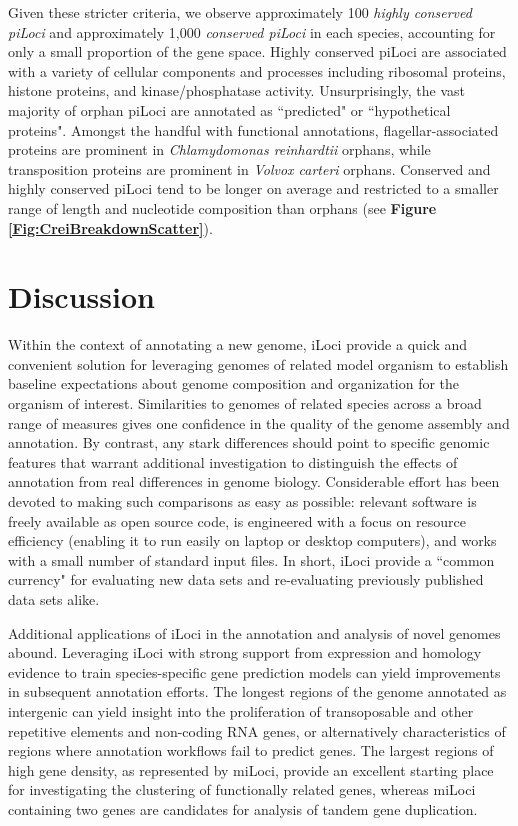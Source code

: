 Given these stricter criteria, we observe approximately 100 \textit{highly conserved piLoci} and approximately 1,000 \textit{conserved piLoci} in each species, accounting for only a small proportion of the gene space.
Highly conserved piLoci are associated with a variety of cellular components and processes including ribosomal proteins, histone proteins, and kinase/phosphatase activity.
Unsurprisingly, the vast majority of orphan piLoci are annotated as ``predicted" or ``hypothetical proteins".
Amongst the handful with functional annotations, flagellar-associated proteins are prominent in \textit{Chlamydomonas reinhardtii} orphans, while transposition proteins are prominent in \textit{Volvox carteri} orphans.
Conserved and highly conserved piLoci tend to be longer on average and restricted to a smaller range of length and nucleotide composition than orphans (see \textbf{Figure \ref{Fig:CreiBreakdownScatter}}).









\section{Discussion}

Within the context of annotating a new genome, iLoci provide a quick and convenient solution for leveraging genomes of related model organism to establish baseline expectations about genome composition and organization for the organism of interest.
Similarities to genomes of related species across a broad range of measures gives one confidence in the quality of the genome assembly and annotation.
By contrast, any stark differences should point to specific genomic features that warrant additional investigation to distinguish the effects of annotation from real differences in genome biology.
Considerable effort has been devoted to making such comparisons as easy as possible: relevant software is freely available as open source code, is engineered with a focus on resource efficiency (enabling it to run easily on laptop or desktop computers), and works with a small number of standard input files.
In short, iLoci provide a ``common currency" for evaluating new data sets and re-evaluating previously published data sets alike.

Additional applications of iLoci in the annotation and analysis of novel genomes abound.
Leveraging iLoci with strong support from expression and homology evidence to train species-specific gene prediction models can yield improvements in subsequent annotation efforts.
The longest regions of the genome annotated as intergenic can yield insight into the proliferation of transoposable and other repetitive elements and non-coding RNA genes, or alternatively characteristics of regions where annotation workflows fail to predict genes.
The largest regions of high gene density, as represented by miLoci, provide an excellent starting place for investigating the clustering of functionally related genes, whereas miLoci containing two genes are candidates for analysis of tandem gene duplication.

